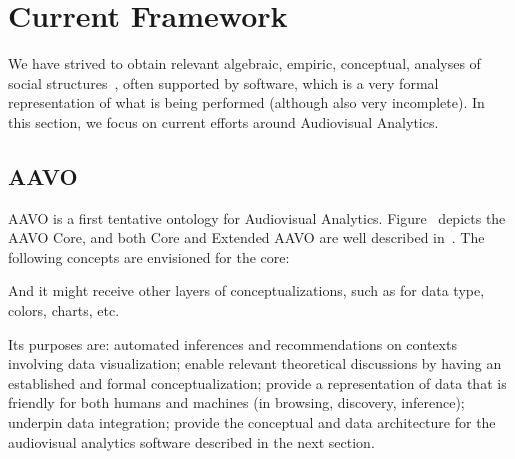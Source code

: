 \documentclass[letterpaper,10pt]{article}
\begin{document}
\section{Current Framework}\label{current}
We have strived to obtain relevant algebraic, empiric, conceptual,
analyses of social structures~\cite{tese,stab},
often supported by software, which is a very formal representation
of what is being performed (although also very incomplete).
In this section, we focus on current efforts around Audiovisual Analytics.

\subsection{AAVO}
AAVO is a first tentative ontology for Audiovisual Analytics.
Figure~\cite{aavo} depicts the AAVO Core,
and both Core and Extended AAVO are well described in~\cite{aavoA}.
The following concepts are envisioned for the core:

And it might receive other layers of conceptualizations,
such as for data type, colors, charts, etc.

Its purposes are: automated inferences and recommendations on
contexts involving data visualization;
enable relevant theoretical discussions by having an
established and formal conceptualization;
provide a representation of data that is friendly for
both humans and machines (in browsing, discovery, inference);
underpin data integration;
provide the conceptual and data architecture for
the audiovisual analytics software described in
the next section.
\end{document}
